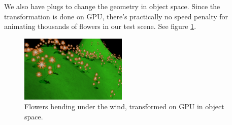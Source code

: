 \documentclass{egpubl}
\begin{document}


We also have plugs to change the geometry in object space.
Since the transformation is done on GPU, there's practically
no speed penalty for animating thousands of flowers in our test scene.
See figure \ref{fig_flowers}.

\setcounter{figure}{9}
\begin{figure}[H]
  \centering
  \includegraphics[width=2in]{flowers}
  \caption{Flowers bending under the wind, transformed on GPU in object space.}
  \label{fig_flowers}
\end{figure}
\end{document}
